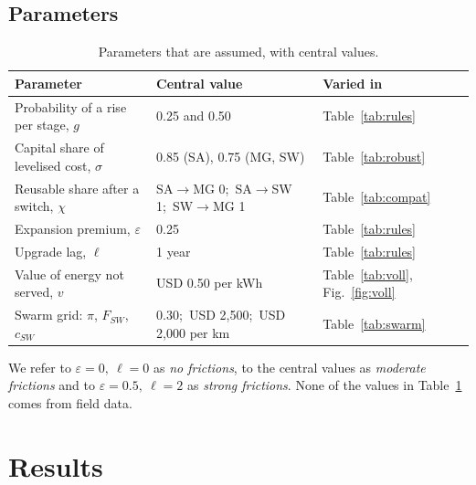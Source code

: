 \documentclass[11pt,a4paper]{article}
\begin{document}
\subsection{Parameters}
\begin{table}[!ht]\centering\small
\caption{Parameters that are assumed, with central values.}\label{tab:par}
\begin{tabular}{lll}\toprule
Parameter & Central value & Varied in\\\midrule
Probability of a rise per stage, $g$ & 0.25 and 0.50 & Table~\ref{tab:rules}\\
Capital share of levelised cost, $\sigma$ & 0.85 (SA), 0.75 (MG, SW) & Table~\ref{tab:robust}\\
Reusable share after a switch, $\chi$ & SA$\to$MG 0;\ SA$\to$SW 1;\ SW$\to$MG 1 & Table~\ref{tab:compat}\\
Expansion premium, $\varepsilon$ & 0.25 & Table~\ref{tab:rules}\\
Upgrade lag, $\ell$ & 1 year & Table~\ref{tab:rules}\\
Value of energy not served, $v$ & USD 0.50 per kWh & Table~\ref{tab:voll}, Fig.~\ref{fig:voll}\\
Swarm grid: $\pi$, $F_{SW}$, $c_{SW}$ & 0.30;\ USD 2,500;\ USD 2,000 per km & Table~\ref{tab:swarm}\\\bottomrule
\end{tabular}
\end{table}
We refer to $\varepsilon=0,\ \ell=0$ as \emph{no frictions}, to the central values as \emph{moderate frictions} and
to $\varepsilon=0.5,\ \ell=2$ as \emph{strong frictions}. None of the values in Table~\ref{tab:par} comes from field
data.

\section{Results}
\end{document}
